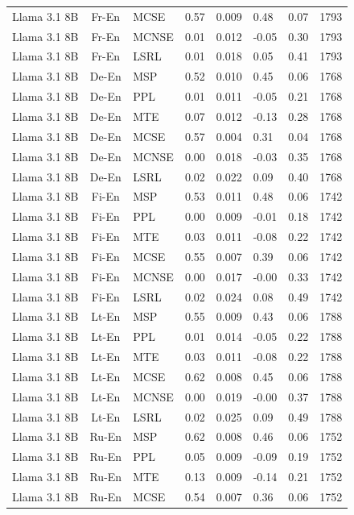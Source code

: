 \begin{table}
\begin{tabular}{lc}
Llama 3.1 8B & Fr-En & MCSE & 0.57 & 0.009 & 0.48 & 0.07 & 1793 \\
Llama 3.1 8B & Fr-En & MCNSE & 0.01 & 0.012 & -0.05 & 0.30 & 1793 \\
Llama 3.1 8B & Fr-En & LSRL & 0.01 & 0.018 & 0.05 & 0.41 & 1793 \\
Llama 3.1 8B & De-En & MSP & 0.52 & 0.010 & 0.45 & 0.06 & 1768 \\
Llama 3.1 8B & De-En & PPL & 0.01 & 0.011 & -0.05 & 0.21 & 1768 \\
Llama 3.1 8B & De-En & MTE & 0.07 & 0.012 & -0.13 & 0.28 & 1768 \\
Llama 3.1 8B & De-En & MCSE & 0.57 & 0.004 & 0.31 & 0.04 & 1768 \\
Llama 3.1 8B & De-En & MCNSE & 0.00 & 0.018 & -0.03 & 0.35 & 1768 \\
Llama 3.1 8B & De-En & LSRL & 0.02 & 0.022 & 0.09 & 0.40 & 1768 \\
Llama 3.1 8B & Fi-En & MSP & 0.53 & 0.011 & 0.48 & 0.06 & 1742 \\
Llama 3.1 8B & Fi-En & PPL & 0.00 & 0.009 & -0.01 & 0.18 & 1742 \\
Llama 3.1 8B & Fi-En & MTE & 0.03 & 0.011 & -0.08 & 0.22 & 1742 \\
Llama 3.1 8B & Fi-En & MCSE & 0.55 & 0.007 & 0.39 & 0.06 & 1742 \\
Llama 3.1 8B & Fi-En & MCNSE & 0.00 & 0.017 & -0.00 & 0.33 & 1742 \\
Llama 3.1 8B & Fi-En & LSRL & 0.02 & 0.024 & 0.08 & 0.49 & 1742 \\
Llama 3.1 8B & Lt-En & MSP & 0.55 & 0.009 & 0.43 & 0.06 & 1788 \\
Llama 3.1 8B & Lt-En & PPL & 0.01 & 0.014 & -0.05 & 0.22 & 1788 \\
Llama 3.1 8B & Lt-En & MTE & 0.03 & 0.011 & -0.08 & 0.22 & 1788 \\
Llama 3.1 8B & Lt-En & MCSE & 0.62 & 0.008 & 0.45 & 0.06 & 1788 \\
Llama 3.1 8B & Lt-En & MCNSE & 0.00 & 0.019 & -0.00 & 0.37 & 1788 \\
Llama 3.1 8B & Lt-En & LSRL & 0.02 & 0.025 & 0.09 & 0.49 & 1788 \\
Llama 3.1 8B & Ru-En & MSP & 0.62 & 0.008 & 0.46 & 0.06 & 1752 \\
Llama 3.1 8B & Ru-En & PPL & 0.05 & 0.009 & -0.09 & 0.19 & 1752 \\
Llama 3.1 8B & Ru-En & MTE & 0.13 & 0.009 & -0.14 & 0.21 & 1752 \\
Llama 3.1 8B & Ru-En & MCSE & 0.54 & 0.007 & 0.36 & 0.06 & 1752 \\

\end{tabular}
\end{table}

